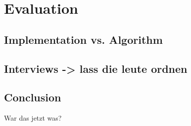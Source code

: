 \chapter{Evaluation}

\section{Implementation vs. Algorithm}

\section{Interviews -> lass die leute ordnen}

\section{Conclusion}
War das jetzt was?

